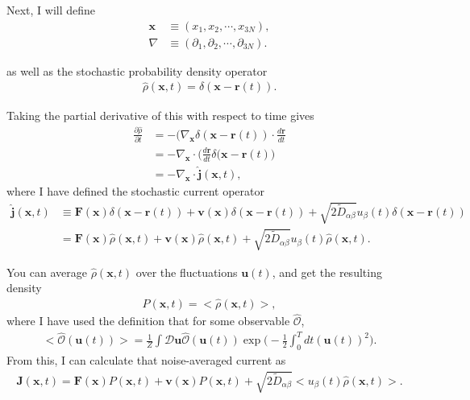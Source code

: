 \documentclass{article}
\begin{document}
Next, I will define
\begin{align}
  \bm{x}&\equiv(x_1,x_2,\cdots,x_{3N}),\\
  \nabla&\equiv(\partial_1,\partial_2,\cdots,\partial_{3N}).
\end{align}

as well as the stochastic probability density operator
\begin{align}
  \hat{\rho}(\bm{x},t)=\delta(\bm{x}-\bm{r}(t)).
\end{align}

Taking the partial derivative of this with respect to time gives
\begin{align}
  \frac{\partial\hat{\rho}}{\partial t}&=-(\nabla_{\bm{x}}\delta(\bm{x}-\bm{r}(t))
                                         \cdot\frac{d\bm{r}}{dt}\nonumber\\
                                       &=-\nabla_{\bm{x}}\cdot\bigg(\frac{d\bm{r}}{dt}
                                         \delta(\bm{x}-\bm{r}(t)\bigg)\nonumber\\
                                       &=-\nabla_{\bm{x}}\cdot\hat{\bm{j}}(\bm{x},t),
\end{align}
where I have defined the stochastic current operator
\begin{align}
  \hat{\bm{j}}(\bm{x},t)&\equiv\bm{F}(\bm{x})\delta(\bm{x}-\bm{r}(t))
                          +\bm{v}(\bm{x})\delta(\bm{x}-\bm{r}(t))
                          +\sqrt{2\tilde{D}_{\alpha\beta}}u_{\beta}(t)
                          \delta(\bm{x}-\bm{r}(t))\nonumber\\
                        &=\bm{F}(\bm{x})\hat{\rho}(\bm{x},t)
                          +\bm{v}(\bm{x})\hat{\rho}(\bm{x},t)
                          +\sqrt{2\tilde{D}_{\alpha\beta}}u_{\beta}(t)\hat{\rho}(\bm{x},t).
\end{align}

You can average $\hat{\rho}(\bm{x},t)$ over the fluctuations $\bm{u}(t)$, and get the
resulting density
\begin{align}
  P(\bm{x},t)=<\hat{\rho}(\bm{x},t)>,
\end{align}
where I have used the definition that for some observable $\hat{\mathcal{O}}$,
\begin{align}
  <\hat{\mathcal{O}}(\bm{u}(t))>=\frac{1}{Z}\int\mathcal{D}\bm{u}
  \hat{\mathcal{O}}(\bm{u}(t))\exp\bigg(-\frac{1}{2}\int_0^Tdt(\bm{u}(t))^2\bigg).
\end{align}
From this, I can calculate that noise-averaged current as
\begin{align}
  \bm{J}(\bm{x},t)=\bm{F}(\bm{x})P(\bm{x},t)+\bm{v}(\bm{x})P(\bm{x},t)
  +\sqrt{2\tilde{D}_{\alpha\beta}}<u_{\beta}(t)\hat{\rho}(\bm{x},t)>.
\end{align}
\end{document}
